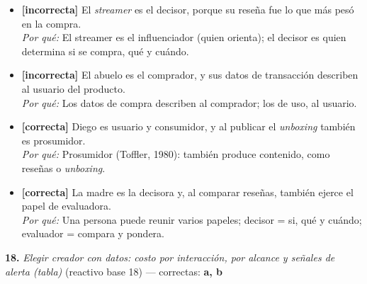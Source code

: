 \documentclass[10pt,letterpaper]{article}
\begin{document}
\begin{itemize}[leftmargin=1.2em,itemsep=0pt,topsep=1pt,parsep=0pt]
\item[\textbf{a)}] {\footnotesize \textbf{[incorrecta]} El \textit{streamer} es el decisor, porque su reseña fue lo que más pesó en la compra.\\ \textit{Por qué:} El streamer es el influenciador (quien orienta); el decisor es quien determina si se compra, qué y cuándo.}
\item[\textbf{b)}] {\footnotesize \textbf{[incorrecta]} El abuelo es el comprador, y sus datos de transacción describen al usuario del producto.\\ \textit{Por qué:} Los datos de compra describen al comprador; los de uso, al usuario.}
\item[\textbf{c)}] {\footnotesize \textbf{[correcta]} Diego es usuario y consumidor, y al publicar el \textit{unboxing} también es prosumidor.\\ \textit{Por qué:} Prosumidor (Toffler, 1980): también produce contenido, como reseñas o \textit{unboxing}.}
\item[\textbf{d)}] {\footnotesize \textbf{[correcta]} La madre es la decisora y, al comparar reseñas, también ejerce el papel de evaluadora.\\ \textit{Por qué:} Una persona puede reunir varios papeles; decisor = si, qué y cuándo; evaluador = compara y pondera.}
\end{itemize}
\vspace{3pt}\noindent\textbf{18.} \textit{Elegir creador con datos: costo por interacción, por alcance y señales de alerta (tabla)} (reactivo base 18) — correctas: \textbf{a, b}\\[-1pt]
\end{document}

